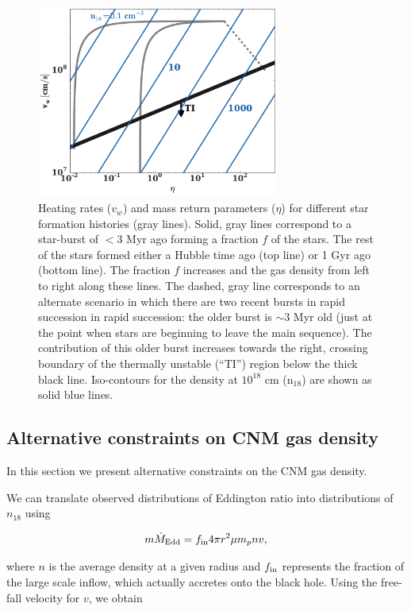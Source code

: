 \documentclass[usenatbib,fleqn]{mnras}
\begin{document}
\begin{figure} 
  \includegraphics[width=8cm]{cnm_plot.pdf}
  \caption{\label{fig:param} Heating rates ($v_w$) and mass return
    parameters ($\eta$) for different star formation histories (gray
    lines). Solid, gray lines correspond to a star-burst of $<3$ Myr
    ago forming a fraction $f$ of the stars. The rest of the stars
    formed either a Hubble time ago (top line) or 1 Gyr ago (bottom
    line). The fraction $f$ increases and the gas density from left to
    right along these lines. The dashed, gray line corresponds to an
    alternate scenario in which there are two recent bursts in rapid
    succession in rapid succession: the older burst is $\sim 3$ Myr
    old (just at the point when stars are beginning to leave the main
    sequence). The contribution of this older burst increases towards
    the right, crossing boundary of the thermally unstable (``TI'')
    region below the thick black line. Iso-contours for the density at
    $10^{18}$ cm ($\mathrm{n_{18}}$) are shown as solid blue lines.} 
\end{figure}


\subsection{Alternative constraints on CNM gas density}
In this section we present alternative constraints on the CNM gas
density.  

We can translate observed distributions of Eddington ratio into 
distributions of $n_{18}$ using

\begin{equation}
m \dot{M}_{\rm Edd}= f_{\rm in} 4 \pi r^2 \mu m_p n v,
\end{equation}

where $n$ is the average density at a given radius and $f_{\rm in}$
represents the fraction of the large scale inflow, which actually
accretes onto the black hole.  Using the free-fall velocity for
$v$, we obtain
\end{document}

